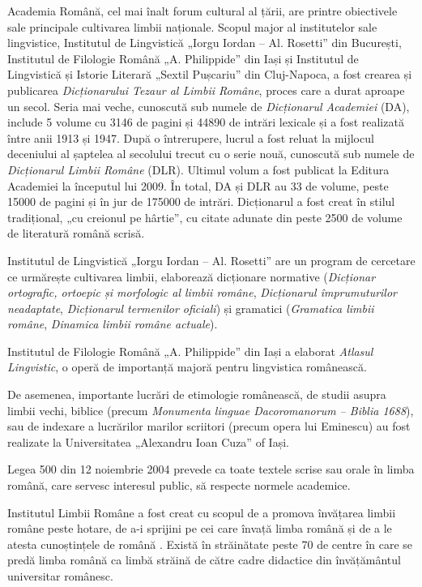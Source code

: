 \begin{multicols}{2}
Academia Română, cel mai înalt forum cultural al țării, are printre obiectivele sale principale cultivarea limbii naționale. Scopul major al institutelor sale lingvistice, Institutul de Lingvistică „Iorgu Iordan – Al. Rosetti” din București, Institutul de Filologie Română „A. Philippide” din Iași și Institutul de Lingvistică și Istorie Literară „Sextil Pușcariu” din Cluj-Napoca, a fost crearea și publicarea \textit{Dicționarului Tezaur al Limbii Române}, proces care a durat aproape un secol. Seria mai veche, cunoscută sub numele de \textit{Dicționarul Academiei} (DA), include 5 volume cu 3146 de pagini și 44890 de intrări lexicale și a fost realizată între anii 1913 și 1947. După o întrerupere, lucrul a fost reluat la mijlocul deceniului al șaptelea al secolului trecut cu o serie nouă, cunoscută sub numele de \textit{Dicționarul Limbii Române} (DLR). Ultimul volum a fost publicat la Editura Academiei la începutul lui 2009. În total, DA și DLR au 33 de volume, peste 15000 de pagini și în jur de 175000 de intrări. Dicționarul a fost creat în stilul tradițional, „cu creionul pe hârtie”, cu citate adunate din peste 2500 de volume de literatură română scrisă.

Institutul de Lingvistică „Iorgu Iordan – Al. Rosetti” are un program de cercetare ce urmărește cultivarea limbii, elaborează dicționare normative (\textit{Dicționar ortografic, ortoepic și morfologic al limbii române}, \textit{Dicționarul împrumuturilor neadaptate}, \textit{Dicționarul termenilor oficiali}) și gramatici (\textit{Gramatica limbii române}, \textit{Dinamica limbii române actuale}).

Institutul de Filologie Română „A. Philippide” din Iași a elaborat \textit{Atlasul Lingvistic}, o operă de importanță majoră pentru lingvistica românească.

De asemenea, importante lucrări de etimologie românească, de studii asupra limbii vechi, biblice (precum \textit{Monumenta linguae Dacoromanorum – Biblia 1688}), sau de indexare a lucrărilor marilor scriitori (precum opera lui Eminescu) au fost realizate la Universitatea „Alexandru Ioan Cuza” of Iași. 

Legea 500 din 12 noiembrie 2004 prevede ca toate textele scrise sau orale în limba română, care servesc interesul public, să respecte normele academice.


Institutul Limbii Române a fost creat cu scopul de a promova învățarea limbii române peste hotare, de a-i sprijini pe cei care învață limba română și de a le atesta cunoștințele de română \cite{urlILR}. Există în străinătate peste 70 de centre în care se predă limba română ca limbă străină de către cadre didactice din învățământul universitar românesc.


\end{multicols}
